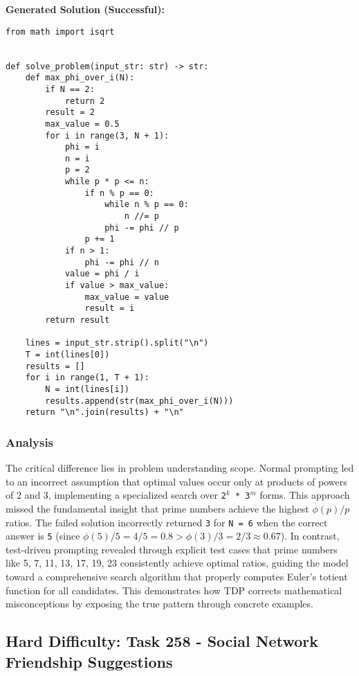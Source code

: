 \documentclass{article}
\begin{document}
\textbf{Generated Solution (Successful):}
\begin{lstlisting}
from math import isqrt


def solve_problem(input_str: str) -> str:
    def max_phi_over_i(N):
        if N == 2:
            return 2
        result = 2
        max_value = 0.5
        for i in range(3, N + 1):
            phi = i
            n = i
            p = 2
            while p * p <= n:
                if n % p == 0:
                    while n % p == 0:
                        n //= p
                    phi -= phi // p
                p += 1
            if n > 1:
                phi -= phi // n
            value = phi / i
            if value > max_value:
                max_value = value
                result = i
        return result

    lines = input_str.strip().split("\n")
    T = int(lines[0])
    results = []
    for i in range(1, T + 1):
        N = int(lines[i])
        results.append(str(max_phi_over_i(N)))
    return "\n".join(results) + "\n"
\end{lstlisting}

\subsubsection{Analysis}

The critical difference lies in problem understanding scope. Normal prompting led to an incorrect assumption that optimal values occur only at products of powers of 2 and 3, implementing a specialized search over \texttt{2$^k$ * 3$^m$} forms. This approach missed the fundamental insight that prime numbers achieve the highest $\phi(p)/p$ ratios. The failed solution incorrectly returned \texttt{3} for \texttt{N = 6} when the correct answer is \texttt{5} (since $\phi(5)/5 = 4/5 = 0.8 > \phi(3)/3 = 2/3 \approx 0.67$). In contrast, test-driven prompting revealed through explicit test cases that prime numbers like 5, 7, 11, 13, 17, 19, 23 consistently achieve optimal ratios, guiding the model toward a comprehensive search algorithm that properly computes Euler's totient function for all candidates. This demonstrates how TDP corrects mathematical misconceptions by exposing the true pattern through concrete examples.

\subsection{Hard Difficulty: Task 258 - Social Network Friendship Suggestions}
\label{appendix:task258}
\end{document}
